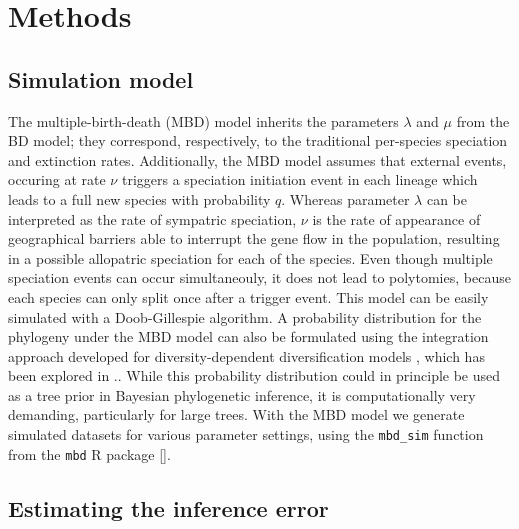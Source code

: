 \section{Methods}

\subsection{Simulation model}

The multiple-birth-death (MBD) model inherits the parameters $\lambda$ and $\mu$ from the BD model; they correspond, respectively, 
to the traditional per-species speciation and extinction rates. 
Additionally, the MBD model assumes that external events, occuring at rate $\nu$ triggers a speciation initiation event in each lineage which leads to a full new species with probability $q$. 
Whereas parameter $\lambda$ can be interpreted as the rate of sympatric speciation, $\nu$ is the rate of appearance of 
geographical barriers able to interrupt the gene flow in the population,
resulting in a possible allopatric speciation for each of the species.  
Even though multiple speciation events can occur simultaneouly, it does not lead to  
polytomies, because each species can only split once after a trigger event. This model can be easily simulated with a Doob-Gillespie algorithm. A probability distribution for the phylogeny under the MBD model can also be formulated using the integration approach developed for diversity-dependent diversification models \citep{etienne2012diversity}, which has been explored in \cite{mbd}.. While this probability distribution could in principle be used as a tree prior in Bayesian phylogenetic inference, it is computationally very demanding, particularly for large trees. With the MBD model we generate simulated datasets for various parameter settings, using the \verb;mbd_sim; function from the \verb;mbd; R package [\citep{mbd}].

\subsection{Estimating the inference error}

